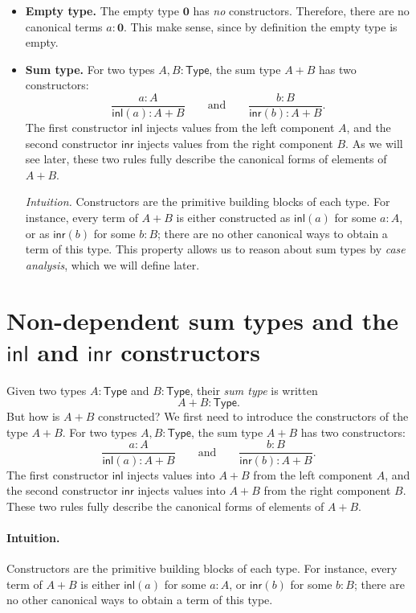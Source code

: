 \documentclass{article}
\newcommand{\Type}{\ensuremath{\mathsf{Type}}}
\newcommand{\inl}{\mathsf{inl}}
\newcommand{\inr}{\mathsf{inr}}
\begin{document}
\begin{itemize}
  \item \textbf{Empty type.}  
  The empty type \(\mathbf{0}\) has \emph{no} constructors.  
  Therefore, there are no canonical terms \(a : \mathbf{0}\). This make sense, since by definition the empty type is empty.

  \item \textbf{Sum type.}  
  For two types \(A, B : \Type\), the sum type \(A + B\) has two constructors:
  \[
  \frac{a : A}{\inl(a) : A + B}
  \qquad\text{and}\qquad
  \frac{b : B}{\inr(b) : A + B}.
  \]
  The first constructor \(\inl\) injects values from the left component \(A\),
  and the second constructor \(\inr\) injects values from the right component \(B\).
  As we will see later, these two rules fully describe the canonical forms of elements of \(A + B\).
  
  \textit{Intuition.} Constructors are the primitive building blocks of each type. For instance, every term of \(A + B\) is either constructed as \(\inl(a)\) for some \(a : A\), or as \(\inr(b)\) for some \(b : B\); there are no other canonical ways to obtain a term of this type. This property allows us to reason about sum types by \emph{case analysis}, which we will define later.
\end{itemize}

\section{Non-dependent sum types and the \texorpdfstring{$\mathsf{inl}$}{inl} and \texorpdfstring{$\mathsf{inr}$}{inr} constructors}

Given two types \(A : \Type\) and \(B : \Type\), their \emph{sum type}
is written
\[
A + B : \Type.
\]
But how is $A + B$ constructed? We first need to introduce the constructors of the type $A+B$. For two types \(A, B : \Type\), the sum type \(A + B\) has two constructors:
\[
\frac{a : A}{\inl(a) : A + B}
\qquad\text{and}\qquad
\frac{b : B}{\inr(b) : A + B}.
\]
The first constructor \(\inl\) injects values into $A+B$ from the left component \(A\), and the second constructor \(\inr\) injects values into $A+B$ from the right component \(B\). These two rules fully describe the canonical forms of elements of \(A + B\).

\paragraph{Intuition.}
Constructors are the primitive building blocks of each type.  
For instance, every term of \(A + B\) is either \(\inl(a)\) for some \(a : A\), or \(\inr(b)\) for some \(b : B\); there are no other canonical ways to obtain a term of this type.
\end{document}
